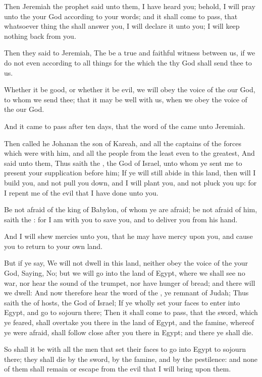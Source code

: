 \verse Then Jeremiah the prophet said unto them, I have heard you; behold, I will pray unto the \LORD your God according to your words; and it shall come to pass, that whatsoever thing the \LORD shall answer you, I will declare it unto you; I will keep nothing back from you.

\verse Then they said to Jeremiah, The \LORD be a true and faithful witness between us, if we do not even according to all things for the which the \LORD thy God shall send thee to us.

\verse Whether it be good, or whether it be evil, we will obey the voice of the \LORD our God, to whom we send thee; that it may be well with us, when we obey the voice of the \LORD our God.

\verse And it came to pass after ten days, that the word of the \LORD came unto Jeremiah.

\verse Then called he Johanan the son of Kareah, and all the captains of the forces which were with him, and all the people from the least even to the greatest, \verse And said unto them, Thus saith the \LORD, the God of Israel, unto whom ye sent me to present your supplication before him; \verse If ye will still abide in this land, then will I build you, and not pull you down, and I will plant you, and not pluck you up: for I repent me of the evil that I have done unto you.

\verse Be not afraid of the king of Babylon, of whom ye are afraid; be not afraid of him, saith the \LORD: for I am with you to save you, and to deliver you from his hand.

\verse And I will shew mercies unto you, that he may have mercy upon you, and cause you to return to your own land.

\verse But if ye say, We will not dwell in this land, neither obey the voice of the \LORD your God, \verse Saying, No; but we will go into the land of Egypt, where we shall see no war, nor hear the sound of the trumpet, nor have hunger of bread; and there will we dwell: \verse And now therefore hear the word of the \LORD, ye remnant of Judah; Thus saith the \LORD of hosts, the God of Israel; If ye wholly set your faces to enter into Egypt, and go to sojourn there; \verse Then it shall come to pass, that the sword, which ye feared, shall overtake you there in the land of Egypt, and the famine, whereof ye were afraid, shall follow close after you there in Egypt; and there ye shall die.

\verse So shall it be with all the men that set their faces to go into Egypt to sojourn there; they shall die by the sword, by the famine, and by the pestilence: and none of them shall remain or escape from the evil that I will bring upon them.

